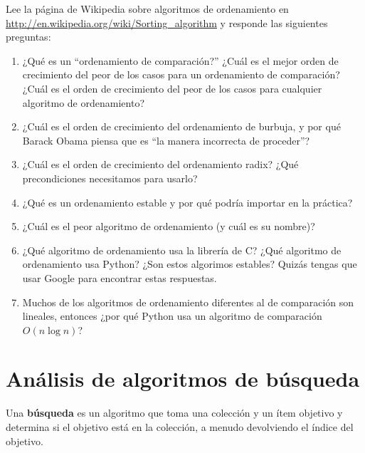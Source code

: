 \documentclass[10pt]{book}
\begin{document}
\begin{exercise}

Lee la página de Wikipedia sobre algoritmos de ordenamiento en
\url{http://en.wikipedia.org/wiki/Sorting_algorithm} y responde
las siguientes preguntas:

\begin{enumerate}

\item ¿Qué es un ``ordenamiento de comparación?'' ¿Cuál es el mejor orden de crecimiento
  del peor de los casos para un ordenamiento de comparación?  ¿Cuál es el orden de crecimiento
  del peor de los casos para cualquier algoritmo de ordenamiento?

\item ¿Cuál es el orden de crecimiento del ordenamiento de burbuja, y por qué Barack
  Obama piensa que es ``la manera incorrecta de proceder''?

\item ¿Cuál es el orden de crecimiento del ordenamiento radix?  ¿Qué precondiciones
  necesitamos para usarlo?

\item ¿Qué es un ordenamiento estable y por qué podría importar en la práctica?

\item ¿Cuál es el peor algoritmo de ordenamiento (y cuál es su nombre)?

\item ¿Qué algoritmo de ordenamiento usa la librería de C?  ¿Qué algoritmo de ordenamiento
  usa Python?  ¿Son estos algorimos estables?  Quizás tengas que
  usar Google para encontrar estas respuestas.

\item Muchos de los algoritmos de ordenamiento diferentes al de comparación son lineales, entonces ¿por qué
  Python usa un algoritmo de comparación $O(n \log n)$?

\end{enumerate}

\end{exercise}


\section{Análisis de algoritmos de búsqueda}

Una {\bf búsqueda} es un algoritmo que toma una colección y un ítem objetivo
y determina si el objetivo está en la colección, a menudo
devolviendo el índice del objetivo.
\end{document}
